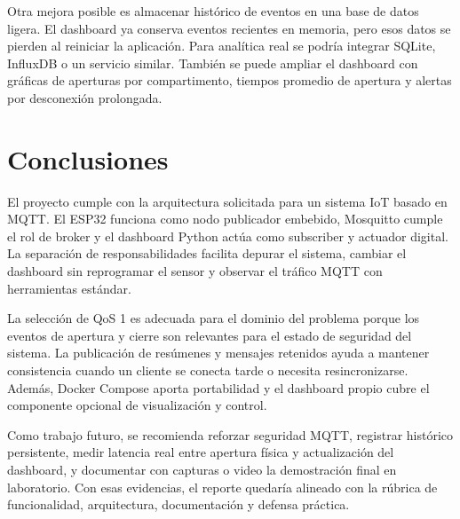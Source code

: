 \documentclass[12pt,letterpaper]{article}
\begin{document}
Otra mejora posible es almacenar histórico de eventos en una base de datos ligera. El dashboard ya conserva eventos recientes en memoria, pero esos datos se pierden al reiniciar la aplicación. Para analítica real se podría integrar SQLite, InfluxDB o un servicio similar. También se puede ampliar el dashboard con gráficas de aperturas por compartimento, tiempos promedio de apertura y alertas por desconexión prolongada.

\section{Conclusiones}

El proyecto cumple con la arquitectura solicitada para un sistema IoT basado en MQTT. El ESP32 funciona como nodo publicador embebido, Mosquitto cumple el rol de broker y el dashboard Python actúa como subscriber y actuador digital. La separación de responsabilidades facilita depurar el sistema, cambiar el dashboard sin reprogramar el sensor y observar el tráfico MQTT con herramientas estándar.

La selección de QoS 1 es adecuada para el dominio del problema porque los eventos de apertura y cierre son relevantes para el estado de seguridad del sistema. La publicación de resúmenes y mensajes retenidos ayuda a mantener consistencia cuando un cliente se conecta tarde o necesita resincronizarse. Además, Docker Compose aporta portabilidad y el dashboard propio cubre el componente opcional de visualización y control.

Como trabajo futuro, se recomienda reforzar seguridad MQTT, registrar histórico persistente, medir latencia real entre apertura física y actualización del dashboard, y documentar con capturas o video la demostración final en laboratorio. Con esas evidencias, el reporte quedaría alineado con la rúbrica de funcionalidad, arquitectura, documentación y defensa práctica.
\end{document}
